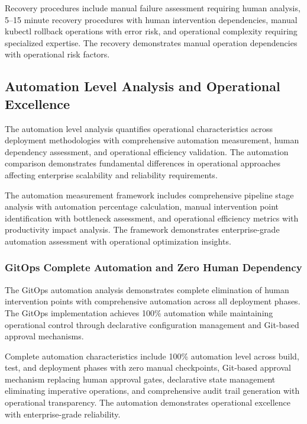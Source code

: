 Recovery procedures include manual failure assessment requiring human analysis, 5--15 minute recovery procedures with human intervention dependencies, manual kubectl rollback operations with error risk, and operational complexity requiring specialized expertise. The recovery demonstrates manual operation dependencies with operational risk factors.


\subsection{Automation Level Analysis and Operational Excellence}
\label{subsec:automation_analysis}

The automation level analysis quantifies operational characteristics across deployment methodologies with comprehensive automation measurement, human dependency assessment, and operational efficiency validation. The automation comparison demonstrates fundamental differences in operational approaches affecting enterprise scalability and reliability requirements.

The automation measurement framework includes comprehensive pipeline stage analysis with automation percentage calculation, manual intervention point identification with bottleneck assessment, and operational efficiency metrics with productivity impact analysis. The framework demonstrates enterprise-grade automation assessment with operational optimization insights.

\subsubsection{GitOps Complete Automation and Zero Human Dependency}

The GitOps automation analysis demonstrates complete elimination of human intervention points with comprehensive automation across all deployment phases. The GitOps implementation achieves 100\% automation while maintaining operational control through declarative configuration management and Git-based approval mechanisms.

Complete automation characteristics include 100\% automation level across build, test, and deployment phases with zero manual checkpoints, Git-based approval mechanism replacing human approval gates, declarative state management eliminating imperative operations, and comprehensive audit trail generation with operational transparency. The automation demonstrates operational excellence with enterprise-grade reliability.

